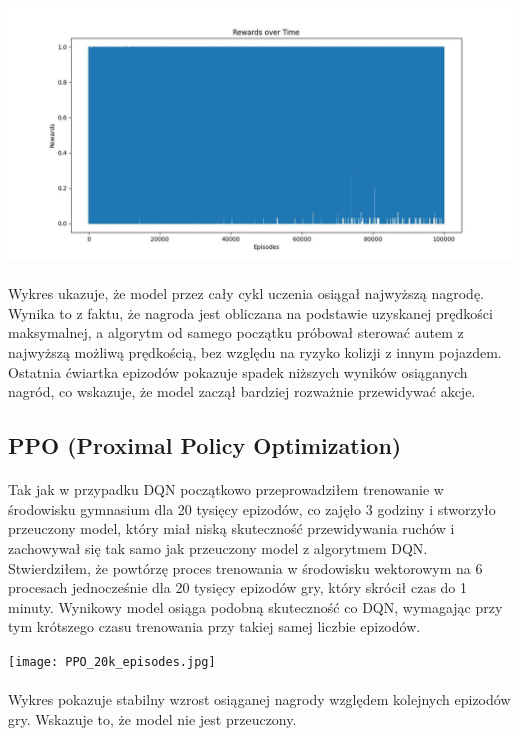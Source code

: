 \documentclass{article}
\begin{document}
\includegraphics[width=1\linewidth]{DQN+CNN.jpg}
\paragraph{}
Wykres ukazuje, że model przez cały cykl uczenia osiągał najwyższą nagrodę. Wynika to z faktu, że nagroda jest obliczana na podstawie uzyskanej prędkości maksymalnej, a algorytm od samego początku próbował sterować autem z najwyższą możliwą prędkością, bez względu na ryzyko kolizji z innym pojazdem. Ostatnia ćwiartka epizodów pokazuje spadek niższych wyników osiąganych nagród, co wskazuje, że model zaczął bardziej rozważnie przewidywać akcje.

\newpage

\subsection{PPO (Proximal Policy Optimization)}
\paragraph{}
Tak jak w przypadku DQN początkowo przeprowadziłem trenowanie w środowisku gymnasium dla 20 tysięcy epizodów, co zajęło 3 godziny i stworzyło przeuczony model, który miał niską skuteczność przewidywania ruchów i zachowywał się tak samo jak przeuczony model z algorytmem DQN. Stwierdziłem, że powtórzę proces trenowania w środowisku wektorowym na 6 procesach jednocześnie dla 20 tysięcy epizodów gry, który skrócił czas do 1 minuty. Wynikowy model osiąga podobną skuteczność co DQN, wymagając przy tym krótszego czasu trenowania przy takiej samej liczbie epizodów.


\texttt{[image: PPO\_20k\_episodes.jpg]}

\paragraph{}
Wykres pokazuje stabilny wzrost osiąganej nagrody względem kolejnych epizodów gry. Wskazuje to, że model nie jest przeuczony.
\end{document}
